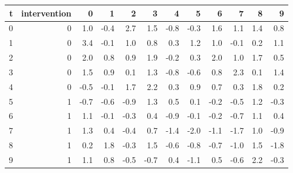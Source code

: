 \begin{tabular}{rrrrrrrrrrrr}
\toprule
t & intervention & 0 & 1 & 2 & 3 & 4 & 5 & 6 & 7 & 8 & 9 \\
\midrule
0 & 0 & 1.0 & -0.4 & 2.7 & 1.5 & -0.8 & -0.3 & 1.6 & 1.1 & 1.4 & 0.8 \\
1 & 0 & 3.4 & -0.1 & 1.0 & 0.8 & 0.3 & 1.2 & 1.0 & -0.1 & 0.2 & 1.1 \\
2 & 0 & 2.0 & 0.8 & 0.9 & 1.9 & -0.2 & 0.3 & 2.0 & 1.0 & 1.7 & 0.5 \\
3 & 0 & 1.5 & 0.9 & 0.1 & 1.3 & -0.8 & -0.6 & 0.8 & 2.3 & 0.1 & 1.4 \\
4 & 0 & -0.5 & -0.1 & 1.7 & 2.2 & 0.3 & 0.9 & 0.7 & 0.3 & 1.8 & 0.2 \\
5 & 1 & -0.7 & -0.6 & -0.9 & 1.3 & 0.5 & 0.1 & -0.2 & -0.5 & 1.2 & -0.3 \\
6 & 1 & 1.1 & -0.1 & -0.3 & 0.4 & -0.9 & -0.1 & -0.2 & -0.7 & 1.1 & 0.4 \\
7 & 1 & 1.3 & 0.4 & -0.4 & 0.7 & -1.4 & -2.0 & -1.1 & -1.7 & 1.0 & -0.9 \\
8 & 1 & 0.2 & 1.8 & -0.3 & 1.5 & -0.6 & -0.8 & -0.7 & -1.0 & 1.5 & -1.8 \\
9 & 1 & 1.1 & 0.8 & -0.5 & -0.7 & 0.4 & -1.1 & 0.5 & -0.6 & 2.2 & -0.3 \\
\bottomrule
\end{tabular}
